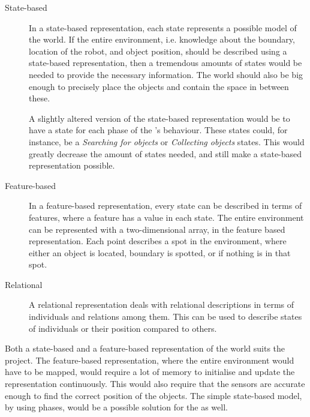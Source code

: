 \begin{description}
\item[State-based] In a state-based representation, each state represents a possible model of the world. If the entire environment, i.e. knowledge about the boundary, location of the robot, and object position, should be described using a state-based representation, then a  tremendous amounts of states would be needed to provide the necessary information. The world should also be big enough to precisely place the objects and contain the space in between these. 

A slightly altered version of the state-based representation would be to have a state for each phase of the \projname{}'s behaviour. These states could, for instance, be a \emph{Searching for objects} or \emph{Collecting objects} states. This would greatly decrease the amount of states needed, and still make a state-based representation possible. 

\item[Feature-based] In a feature-based representation, every state can be described in terms of features, where a feature has a value in each state. The entire environment can be represented with a two-dimensional array, in the feature based representation. Each point describes a spot in the environment, where either an object is located, boundary is spotted, or if nothing is in that spot. 

\item[Relational] A relational representation deals with relational descriptions in terms of individuals and relations among them. This can be used to describe states of individuals or their position compared to others. 
\end{description}

Both a state-based and a feature-based representation of the world suits the project. The feature-based representation, where the entire environment would have to be mapped, would require a lot of memory to initialise and update the representation continuously. This would also require that the sensors are accurate enough to find the correct position of the objects. The simple state-based model, by using phases, would be a possible solution for the \projname{} as well. 

